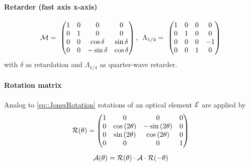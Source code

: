 \paragraph{Retarder (fast axis x-axis)}
\begin{align}
\mat{M}=\
\begin{pmatrix}
    1 & 0 & 0 &  0 \\
    0 & 1 & 0 &  0 \\
    0 & 0 & \cos \delta & \sin \delta \\
    0 & 0 & -\sin \delta &  \cos \delta
\end{pmatrix}
, \enspace
% 
\Lambda_{1/4}=\
\begin{pmatrix}
    1 & 0 & 0 &  0 \\
    0 & 1 & 0 &  0 \\
    0 & 0 & 0 & -1 \\
    0 & 0 & 1 &  0
\end{pmatrix}
\end{align}
with $\delta$ as retardation and $\Lambda_{1/4}$ as quarter-wave retarder.
%
\paragraph{Rotation matrix}
Analog to \cref{eq::JonesRotation} rotations of an optical element $\mathcal{E}$ are applied by
\begin{align}
\centering
\begin{gathered}
\mat{R}(\theta)=
\begin{pmatrix}
    1 &                0 &               0 & 0 \\
    0 & \cos{(2\theta)} & -\sin{(2\theta)} & 0 \\
    0 & \sin{(2\theta)} & \cos{(2\theta)} & 0 \\
    0 &                0 &               0 & 1
\end{pmatrix} \\[0.5em]
\mat{A}(\theta)
=\mat{R}(\theta )\cdot\mat{A}\cdot\mat{R}(-\theta )
\end{gathered}
\end{align}